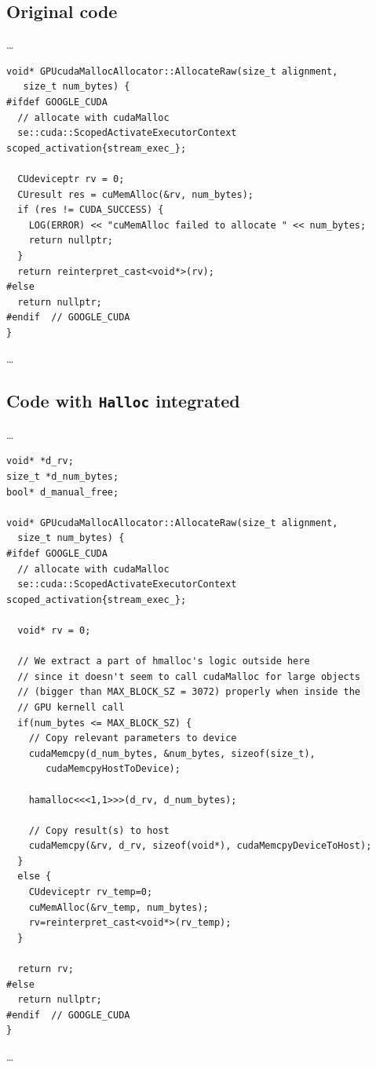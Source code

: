 \documentclass[12pt,twoside]{article}
\begin{document}
\subsection{Original code}
\label{app:gpu-cudamalloc-original}
\ldots
\begin{verbatim}
void* GPUcudaMallocAllocator::AllocateRaw(size_t alignment, 
   size_t num_bytes) {
#ifdef GOOGLE_CUDA
  // allocate with cudaMalloc
  se::cuda::ScopedActivateExecutorContext scoped_activation{stream_exec_};

  CUdeviceptr rv = 0;
  CUresult res = cuMemAlloc(&rv, num_bytes);
  if (res != CUDA_SUCCESS) {
    LOG(ERROR) << "cuMemAlloc failed to allocate " << num_bytes;
    return nullptr;
  }
  return reinterpret_cast<void*>(rv);
#else
  return nullptr;
#endif  // GOOGLE_CUDA
}
\end{verbatim}
\ldots

\subsection{Code with \texttt{Halloc} integrated}
\label{app:gpu-cudamalloc-halloc}
\ldots
\begin{verbatim}
void* *d_rv;
size_t *d_num_bytes;
bool* d_manual_free;

void* GPUcudaMallocAllocator::AllocateRaw(size_t alignment, 
  size_t num_bytes) {
#ifdef GOOGLE_CUDA
  // allocate with cudaMalloc
  se::cuda::ScopedActivateExecutorContext scoped_activation{stream_exec_};

  void* rv = 0;

  // We extract a part of hmalloc's logic outside here
  // since it doesn't seem to call cudaMalloc for large objects
  // (bigger than MAX_BLOCK_SZ = 3072) properly when inside the
  // GPU kernell call
  if(num_bytes <= MAX_BLOCK_SZ) {
    // Copy relevant parameters to device
    cudaMemcpy(d_num_bytes, &num_bytes, sizeof(size_t), 
       cudaMemcpyHostToDevice);

    hamalloc<<<1,1>>>(d_rv, d_num_bytes);

    // Copy result(s) to host
    cudaMemcpy(&rv, d_rv, sizeof(void*), cudaMemcpyDeviceToHost);
  }
  else {
    CUdeviceptr rv_temp=0;
    cuMemAlloc(&rv_temp, num_bytes);
    rv=reinterpret_cast<void*>(rv_temp);
  }

  return rv;
#else
  return nullptr;
#endif  // GOOGLE_CUDA
}
\end{verbatim}
\ldots
\end{document}
